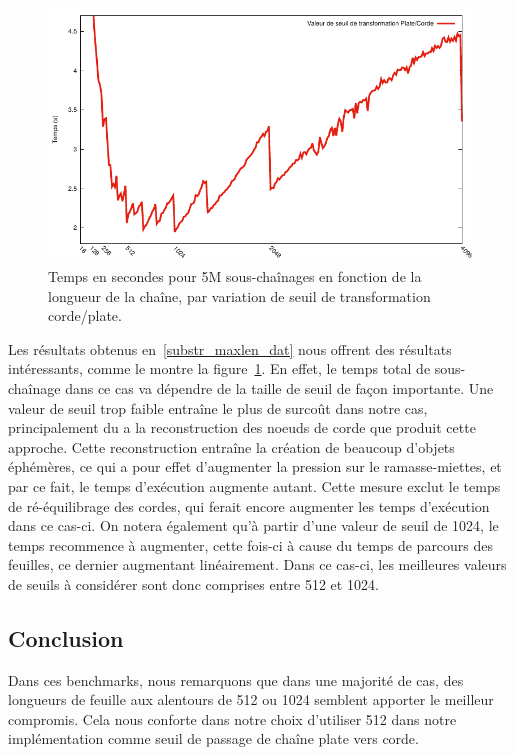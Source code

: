 \begin{figure}
	\caption{Temps en secondes pour 5M sous-chaînages en fonction de la longueur de la chaîne, par variation de seuil de transformation corde/plate.}
	\label{substr_maxlen_fig}
	\centering
	\includegraphics[]{figures/substring_maxlen.pdf}
\end{figure}

Les résultats obtenus en~\ref{substr_maxlen_dat} nous offrent des résultats intéressants,
comme le montre la figure~\ref{substr_maxlen_fig}.
En effet, le temps total de sous-chaînage dans ce cas va dépendre de la taille de seuil
de façon importante.
Une valeur de seuil trop faible entraîne le plus de surcoût dans notre cas, principalement
du a la reconstruction des noeuds de corde que produit cette approche.
Cette reconstruction entraîne la création de beaucoup d'objets éphémères, ce qui
a pour effet d'augmenter la pression sur le ramasse-miettes, et par ce fait, le
temps d'exécution augmente autant.
Cette mesure exclut le temps de ré-équilibrage des cordes, qui ferait encore augmenter
les temps d'exécution dans ce cas-ci.
On notera également qu'à partir d'une valeur de seuil de 1024, le temps recommence à
augmenter, cette fois-ci à cause du temps de parcours des feuilles, ce dernier augmentant linéairement.
Dans ce cas-ci, les meilleures valeurs de seuils à considérer sont donc comprises entre
512 et 1024.

\subsection{Conclusion}

Dans ces benchmarks, nous remarquons que dans une majorité de cas, des longueurs de feuille
aux alentours de 512 ou 1024 semblent apporter le meilleur compromis.
Cela nous conforte dans notre choix d'utiliser 512 dans notre implémentation comme seuil de passage
de chaîne plate vers corde.

